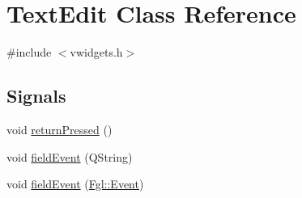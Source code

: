 \hypertarget{classTextEdit}{
\section{TextEdit Class Reference}
\label{classTextEdit}
}


{\ttfamily \#include $<$vwidgets.h$>$}

\subsection*{Signals}
\begin{DoxyCompactItemize}
\item 
void \hyperlink{classTextEdit_a30f34dd7ce24b98584d05cac6fcc4f47}{returnPressed} ()
\item 
void \hyperlink{classTextEdit_a9dcb1bc108329c65469fd6c617ed129c}{fieldEvent} (QString)
\item 
void \hyperlink{classTextEdit_af09e1a5665411fc199bfb75abeedb360}{fieldEvent} (\hyperlink{structFgl_1_1Event}{Fgl::Event})
\end{DoxyCompactItemize}
